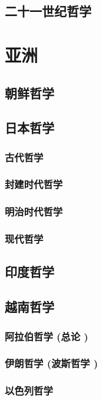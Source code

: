 \documentclass[UTF8]{../RepresentationUniverse}
\begin{document}
\subsection{二十一世纪哲学}



\section{亚洲}
    
\subsection{朝鲜哲学}
\subsection{日本哲学}
    \subsubsection{古代哲学}
    \subsubsection{封建时代哲学}
    \subsubsection{明治时代哲学}
    \subsubsection{现代哲学}

    
\subsection{印度哲学}
\subsection{越南哲学}
    
\subsubsection{阿拉伯哲学 (总论 )}
\subsubsection{伊朗哲学 (波斯哲学 )}
\subsubsection{以色列哲学}
\end{document}
